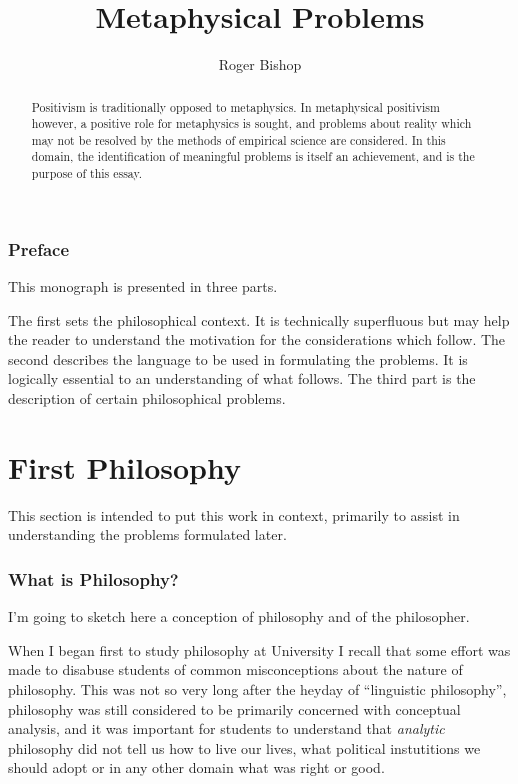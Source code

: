 \documentclass{rbjk}
\begin{document}
                                                                                   
\begin{article}
\begin{opening}  
\title{Metaphysical Problems}
\author{Roger Bishop }

\begin{abstract}
Positivism is traditionally opposed to metaphysics.
In metaphysical positivism however, a positive role for metaphysics is sought, and problems about reality which may not be resolved by the methods of empirical science are considered.
In this domain, the identification of meaningful problems is itself an achievement, and is the purpose of this essay. 
\end{abstract}
\end{opening}

\setcounter{tocdepth}{4}
{\parskip-0pt\tableofcontents}

\section{Preface}

This monograph is presented in three parts.

The first sets the philosophical context.
It is technically superfluous but may help the reader to understand the motivation for the considerations which follow.
The second describes the language to be used in formulating the problems.
It is logically essential to an understanding of what follows.
The third part is the description of certain philosophical problems.

\part{First Philosophy}

This section is intended to put this work in context, primarily to assist in understanding the problems formulated later.

\section{What is Philosophy?}

I'm going to sketch here a conception of philosophy and of the philosopher.

When I began first to study philosophy at University I recall that some effort was made to disabuse students of common misconceptions about the nature of philosophy.
This was not so very long after the heyday of ``linguistic philosophy'', philosophy was still considered to be primarily concerned with conceptual analysis, and it was important for students to understand that {\it analytic} philosophy did not tell us how to live our lives, what political instutitions we should adopt or in any other domain what was right or good.


\end{article}
\end{document}
